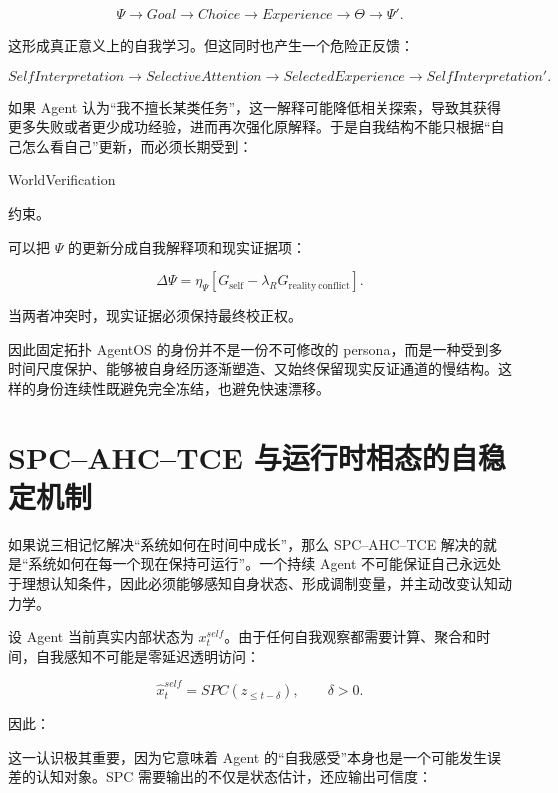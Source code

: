 \[
\Psi
\rightarrow
Goal
\rightarrow
Choice
\rightarrow
Experience
\rightarrow
\Theta
\rightarrow
\Psi'.
\]

这形成真正意义上的自我学习。但这同时也产生一个危险正反馈：

\[
SelfInterpretation
\rightarrow
SelectiveAttention
\rightarrow
SelectedExperience
\rightarrow
SelfInterpretation'.
\]

如果 Agent 认为“我不擅长某类任务”，这一解释可能降低相关探索，导致其获得更多失败或者更少成功经验，进而再次强化原解释。于是自我结构不能只根据“自己怎么看自己”更新，而必须长期受到：

\begin{statementbox}
WorldVerification
\end{statementbox}

约束。

可以把 $\Psi$ 的更新分成自我解释项和现实证据项：

\[
\Delta\Psi
=
\eta_\Psi
\left[
G_{\mathrm{self}}
-
\lambda_R
G_{\mathrm{reality\ conflict}}
\right].
\]

当两者冲突时，现实证据必须保持最终校正权。

因此固定拓扑 AgentOS 的身份并不是一份不可修改的 persona，而是一种受到多时间尺度保护、能够被自身经历逐渐塑造、又始终保留现实反证通道的慢结构。这样的身份连续性既避免完全冻结，也避免快速漂移。

\section{SPC--AHC--TCE 与运行时相态的自稳定机制}

如果说三相记忆解决“系统如何在时间中成长”，那么 SPC--AHC--TCE 解决的就是“系统如何在每一个现在保持可运行”。一个持续 Agent 不可能保证自己永远处于理想认知条件，因此必须能够感知自身状态、形成调制变量，并主动改变认知动力学。

设 Agent 当前真实内部状态为 $x_t^{self}$。由于任何自我观察都需要计算、聚合和时间，自我感知不可能是零延迟透明访问：

\[
\hat{x}^{self}_t
=
SPC
\left(
z_{\leq t-\delta}
\right),
\qquad
\delta>0.
\]

因此：

\begin{statementbox}
\centering
{}
\end{statementbox}

这一认识极其重要，因为它意味着 Agent 的“自我感受”本身也是一个可能发生误差的认知对象。SPC 需要输出的不仅是状态估计，还应输出可信度：

